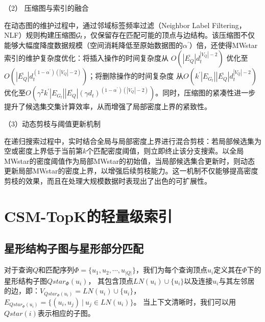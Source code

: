 （2） 压缩图与索引的融合

在动态图的维护过程中，通过邻域标签频率过滤（Neighbor Label Filtering，NLF）\cite{sgi-turbo-iso-DBLP:conf/sigmod/HanLL13}规则构建压缩图$\mathcal{G}_t$，仅保留存在匹配可能的顶点与边结构。该压缩图不仅能够大幅度降度数据规模（空间消耗降低至原始数据图的$\alpha^{\prime}$）倍，还使得MWstar索引的维护复杂度优化：将插入操作的时间复杂度从 $O(|\overline{E_Q}| d_t^{|V_Q|-2})$ 优化至 $O(|\overline{E_Q}| d_t^{(1 - \alpha^{\prime})(|V_Q| - 2)})$；将删除操作的时间复杂度 从$O(k^{\prime}|E_{G_t}| |\overline{E_Q}| d_t^{|V_Q| - 2})$优化至$O(\gamma^2 k^{\prime}|E_{G_t}| |\overline{E_Q}| (\gamma d_t)^{(1 - \alpha^{\prime})(|V_Q| - 2)})$。同时，压缩图的紧凑性进一步提升了候选集交集计算效率，从而增强了局部密度上界的紧致性。

（3）动态剪枝与阈值更新机制

在递归搜索过程中，实时结合全局与局部密度上界进行混合剪枝：若局部候选集为空或密度上界低于当前第$k$个匹配密度阈值，则立即终止该分支搜索。以全局MWstar的密度阈值作为局部MWstar的初始值，当局部候选集合更新时，则动态更新局部MWstar的密度上界，以增强后续剪枝能力。这一机制不仅能够提高密度剪枝的效果，而且在处理大规模数据时表现出了出色的可扩展性。

\section{CSM-TopK的轻量级索引}

\subsection{星形结构子图与星形部分匹配}
\label{mwstar:star_subquery}
\begin{definition}[星形结构子图]\label{def:star-subquery}
对于查询$Q$和匹配序列$\Phi=\{u_1, u_2, \cdots, u_{|Q|} \}$，我们为每个查询顶点$u_i$定义其在$\Phi$下的星形结构子图$Qstar_{\Phi}(u_i)$，
其包含顶点$LN(u_i) \cup \{u_i\}$以及连接$u_i$与其左邻居的边，即：$V_{Qstar_{\Phi}(u_i)} = LN(u_i) \cup \{u_i\}$，$E_{Qstar_{\Phi}(u_i)} = \{(u_i, u_j)\ |\ u_j\in LN(u_i)\}$。
当上下文清晰时，我们可以用$Qstar(i)$表示相应的子图。
\end{definition}

